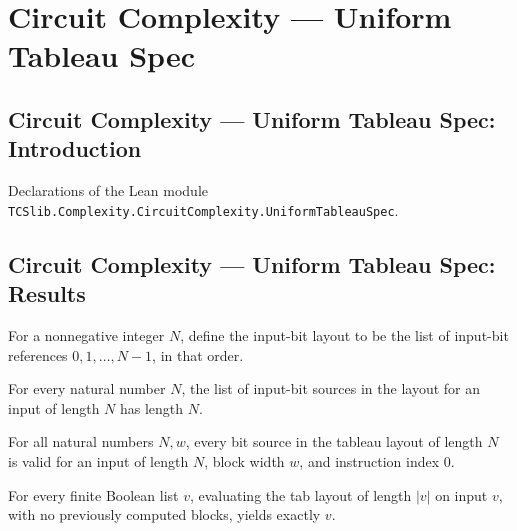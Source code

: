 \section{Circuit Complexity --- Uniform Tableau Spec}
\subsection*{Circuit Complexity --- Uniform Tableau Spec: Introduction}

Declarations of the Lean module \texttt{TCSlib.Complexity.CircuitComplexity.UniformTableauSpec}.

\subsection*{Circuit Complexity --- Uniform Tableau Spec: Results}

\begin{definition}
\label{Complexity.tabLayout}
\leanok
{}
For a nonnegative integer $N$, define the input-bit layout to be the list of input-bit
references $0,1,\ldots,N-1$, in that order.
\end{definition}

\begin{theorem}
\label{Complexity.length_tabLayout}
\leanok
{}
For every natural number $N$, the list of input-bit sources in the layout for an input
of length $N$ has length $N$.
\end{theorem}

\begin{theorem}
\label{Complexity.tabLayout_valid}
\leanok
{}
For all natural numbers $N,w$, every bit source in the tableau layout of length $N$ is
valid for an input of length $N$, block width $w$, and instruction index $0$.
\end{theorem}

\begin{theorem}
\label{Complexity.tabLayout_eval}
\leanok
{}
For every finite Boolean list $v$, evaluating the tab layout of length $|v|$ on input
$v$, with no previously computed blocks, yields exactly $v$.
\end{theorem}

